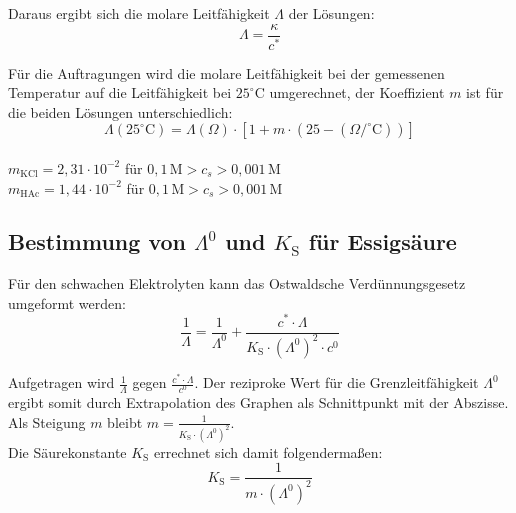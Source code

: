\documentclass[12pt,a4paper,titlepage,headinclude,bibtotoc]{scrartcl}
\begin{document}
Daraus ergibt sich die molare Leitfähigkeit $\Lambda$ der Lösungen:\\

\begin{equation}
\Lambda = \frac{\kappa}{c^*}
\end{equation}

Für die Auftragungen wird die molare Leitfähigkeit bei der gemessenen Temperatur auf die Leitfähigkeit bei $25^\circ\text{C}$ umgerechnet, der Koeffizient $m$ ist für die beiden Lösungen unterschiedlich:\\

\begin{equation}
\Lambda (25^\circ\text{C}) = \Lambda(\Omega) \cdot [1+ m \cdot (25- (\Omega/^\circ\text{C}))]
\end{equation}\\

{\centering
$m_{\mathrm{KCl}} = 2,31 \cdot 10^{-2}$ für $0,1\, \mathrm{M} > c_s > 0,001\, \mathrm{M}$\\
$m_{\mathrm{HAc}} = 1,44 \cdot 10^{-2}$ für $0,1\, \mathrm{M} > c_s > 0,001\, \mathrm{M}$\\}



\subsection{Bestimmung von $\Lambda^0$ und $K_{\mathrm{S}}$ für Essigsäure}

Für den schwachen Elektrolyten kann das Ostwaldsche Verdünnungsgesetz umgeformt werden:\\

\begin{equation}
\frac{1}{\Lambda} = \frac{1}{\Lambda^0} + \frac{c^* \cdot \Lambda}{K_{\mathrm{S}} \cdot (\Lambda^0)^2 \cdot c^0}
\end{equation}

Aufgetragen wird $\frac{1}{\Lambda}$ gegen $\frac{c^* \cdot \Lambda}{c^0}$.
Der reziproke Wert für die Grenzleitfähigkeit $\Lambda^0$ ergibt somit durch Extrapolation des Graphen als Schnittpunkt mit der Abszisse.\\
Als Steigung $m$ bleibt  $m = \frac{1}{K_{\mathrm{S}} \cdot (\Lambda^0)^2 }$.\\
Die Säurekonstante $K_{\mathrm{S}}$ errechnet sich damit folgendermaßen:\\

\begin{equation}
K_{\mathrm{S}} = \frac{1}{m \cdot (\Lambda^0)^2}
\end{equation}
\end{document}
